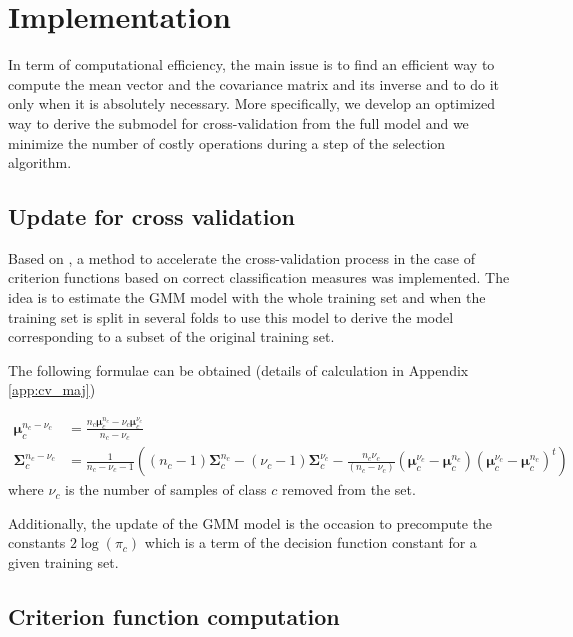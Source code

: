 \documentclass[a4paper]{article}
\begin{document}
    \section{Implementation}
    In term of computational efficiency, the main issue is to find an efficient way to compute the mean vector and the covariance matrix and its inverse and to do it only when it is absolutely necessary. More specifically, we develop an optimized way to derive the submodel for cross-validation from the full model and we minimize the number of costly operations during a step of the selection algorithm.

        \subsection{Update for cross validation}

        Based on \cite{fauvel2015fast}, a method to accelerate the cross-validation process in the case of criterion functions based on correct classification measures was implemented. The idea is to estimate the GMM model with the whole training set and when the training set is split in several folds to use this model to derive the model corresponding to a subset of the original training set.

        The following formulae can be obtained (details of calculation in Appendix \ref{app:cv_maj})

        {\footnotesize
        \begin{align}
            \boldsymbol{\mu}_c^{n_c-\nu_c} &= \frac{n_c \boldsymbol{\mu}_c^{n_c} - \nu_c \boldsymbol{\mu}_c^{\nu_c}}{n_c - \nu_c} \\
            \boldsymbol{\Sigma}_c^{n_c-\nu_c} &= \frac{1}{n_c-\nu_c-1} ( (n_c-1) \boldsymbol{\Sigma}_c^{n_c} - (\nu_c-1) \boldsymbol{\Sigma}_c^{\nu_c} - \frac{n_c \nu_c}{(n_c-\nu_c)} (\boldsymbol{\mu}_c^{\nu_c}-\boldsymbol{\mu}_c^{n_c})(\boldsymbol{\mu}_c^{\nu_c}-\boldsymbol{\mu}_c^{n_c})^t)
        \end{align}
        }%
        where $\nu_c$ is the number of samples of class $c$ removed from the set.

        Additionally, the update of the GMM model is the occasion to precompute the constants $2 \log (\pi_c)$ which is a term of the decision function constant for a given training set.

        \subsection{Criterion function computation}
\end{document}
